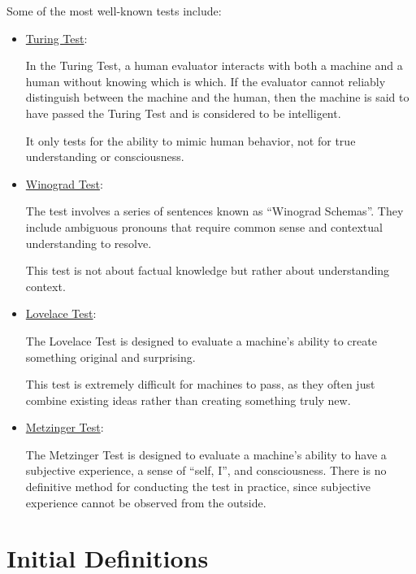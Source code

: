 Some of the most well-known tests include:
\begin{itemize}
    \item \ul{Turing Test}:
    
    In the Turing Test, a human evaluator interacts with both a machine and a human without knowing which is which. If the evaluator cannot reliably distinguish between the machine and the human, then the machine is said to have passed the Turing Test and is considered to be intelligent.

    It only tests for the ability to mimic human behavior, not for true understanding or consciousness.
    \item \ul{Winograd Test}:
    
    The test involves a series of sentences known as ``Winograd Schemas''. They include ambiguous pronouns that require common sense and contextual understanding to resolve.

    This test is not about factual knowledge but rather about understanding context.
    \item \ul{Lovelace Test}:
    
    The Lovelace Test is designed to evaluate a machine's ability to create something original and surprising.

    This test is extremely difficult for machines to pass, as they often just combine existing ideas rather than creating something truly new.
    \item \ul{Metzinger Test}:
    
    The Metzinger Test is designed to evaluate a machine's ability to have a subjective experience, a sense of ``self, I'', and consciousness. There is no definitive method for conducting the test in practice, since subjective experience cannot be observed from the outside.
\end{itemize}


\section{Initial Definitions}

